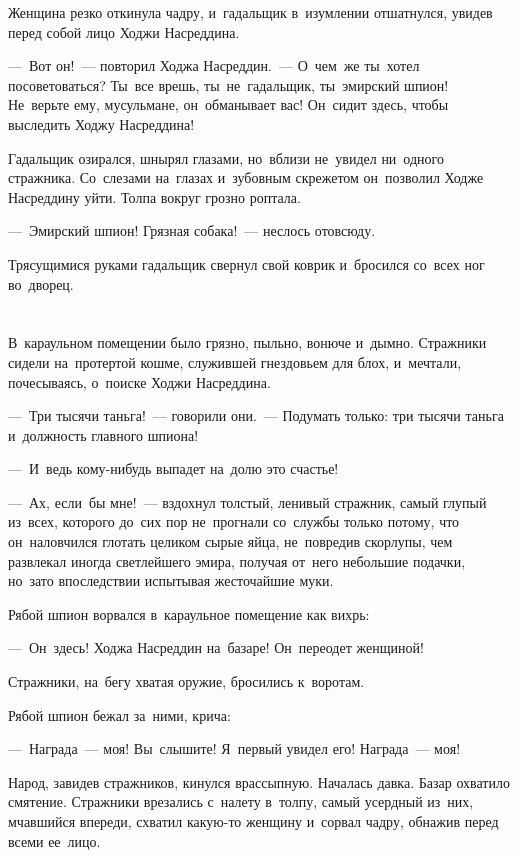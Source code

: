 \documentclass[12pt,a4paper]{book}
\begin{document}
Женщина резко откинула чадру, и~гадальщик в~изумлении отшатнулся, увидев перед собой лицо Ходжи Насреддина.

—~Вот он!~— повторил Ходжа Насреддин.~— О~чем~же ты~хотел посоветоваться? Ты~все врешь, ты~не~гадальщик, ты~эмирский шпион! Не~верьте ему, мусульмане, он~обманывает вас! Он~сидит здесь, чтобы выследить Ходжу Насреддина!

Гадальщик озирался, шнырял глазами, но~вблизи не~увидел ни~одного стражника. Со~слезами на~глазах и~зубовным скрежетом он~позволил Ходже Насреддину уйти. Толпа вокруг грозно роптала.

—~Эмирский шпион! Грязная собака!~— неслось отовсюду.

Трясущимися руками гадальщик свернул свой коврик и~бросился со~всех ног во~дворец.


\chapter{}

В~караульном помещении было грязно, пыльно, вонюче и~дымно. Стражники сидели на~протертой кошме, служившей гнездовьем для блох, и~мечтали, почесываясь, о~поиске Ходжи Насреддина.

—~Три тысячи таньга!~— говорили они.~— Подумать только: три тысячи таньга и~должность главного шпиона!

—~И~ведь кому-нибудь выпадет на~долю это счастье!

—~Ах, если~бы мне!~— вздохнул толстый, ленивый стражник, самый глупый из~всех, которого до~сих пор не~прогнали со~службы только потому, что он~наловчился глотать целиком сырые яйца, не~повредив скорлупы, чем развлекал иногда светлейшего эмира, получая от~него небольшие подачки, но~зато впоследствии испытывая жесточайшие муки.

Рябой шпион ворвался в~караульное помещение как вихрь:

—~Он~здесь! Ходжа Насреддин на~базаре! Он~переодет женщиной!

Стражники, на~бегу хватая оружие, бросились к~воротам.

Рябой шпион бежал за~ними, крича:

—~Награда~— моя! Вы~слышите! Я~первый увидел его! Награда~— моя!

Народ, завидев стражников, кинулся врассыпную. Началась давка. Базар охватило смятение. Стражники врезались с~налету в~толпу, самый усердный из~них, мчавшийся впереди, схватил какую-то женщину и~сорвал чадру, обнажив перед всеми ее~лицо.
\end{document}
